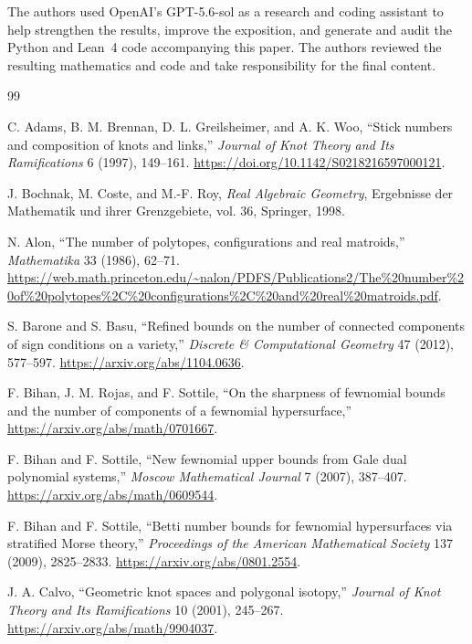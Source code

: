 \documentclass[11pt]{article}
\theoremstyle{remark}
\theoremstyle{plain}
\begin{document}
The authors used OpenAI's GPT-5.6-sol as a research and coding assistant to
help strengthen the results, improve the exposition, and generate and audit
the Python and Lean~4 code accompanying this paper.  The authors reviewed the
resulting mathematics and code and take responsibility for the final content.

\begin{thebibliography}{99}

C. Adams, B. M. Brennan, D. L. Greilsheimer, and A. K. Woo,
``Stick numbers and composition of knots and links,''
\emph{Journal of Knot Theory and Its Ramifications} 6 (1997), 149--161.
\url{https://doi.org/10.1142/S0218216597000121}.

J. Bochnak, M. Coste, and M.-F. Roy,
\emph{Real Algebraic Geometry},
Ergebnisse der Mathematik und ihrer Grenzgebiete, vol. 36,
Springer, 1998.

N. Alon,
``The number of polytopes, configurations and real matroids,''
\emph{Mathematika} 33 (1986), 62--71.
\url{https://web.math.princeton.edu/~nalon/PDFS/Publications2/The%20number%20of%20polytopes%2C%20configurations%2C%20and%20real%20matroids.pdf}.

S. Barone and S. Basu,
``Refined bounds on the number of connected components of sign conditions on a variety,''
\emph{Discrete \& Computational Geometry} 47 (2012), 577--597.
\url{https://arxiv.org/abs/1104.0636}.

F. Bihan, J. M. Rojas, and F. Sottile,
``On the sharpness of fewnomial bounds and the number of components of a fewnomial hypersurface,''
\url{https://arxiv.org/abs/math/0701667}.

F. Bihan and F. Sottile,
``New fewnomial upper bounds from Gale dual polynomial systems,''
\emph{Moscow Mathematical Journal} 7 (2007), 387--407.
\url{https://arxiv.org/abs/math/0609544}.

F. Bihan and F. Sottile,
``Betti number bounds for fewnomial hypersurfaces via stratified Morse theory,''
\emph{Proceedings of the American Mathematical Society} 137 (2009), 2825--2833.
\url{https://arxiv.org/abs/0801.2554}.

J. A. Calvo,
``Geometric knot spaces and polygonal isotopy,''
\emph{Journal of Knot Theory and Its Ramifications} 10 (2001), 245--267.
\url{https://arxiv.org/abs/math/9904037}.


\end{thebibliography}
\end{document}
